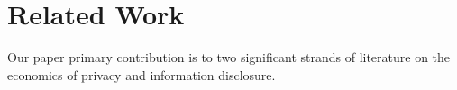 \documentclass[12pt]{article}
\theoremstyle{definition}
\theoremstyle{remark}
\begin{document}

\section{Related Work}\label{sec:lit}

Our paper primary contribution is to two significant strands of literature on the economics of privacy and information disclosure.
\end{document}
